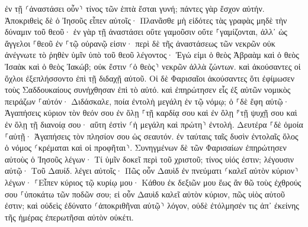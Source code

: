 \documentclass[twoside, 9pt]{extreport}
\begin{document}
ἐν τῇ ⸂ἀναστάσει οὖν⸃ τίνος τῶν ἑπτὰ ἔσται γυνή; πάντες γὰρ ἔσχον αὐτήν. 
Ἀποκριθεὶς δὲ ὁ Ἰησοῦς εἶπεν αὐτοῖς· Πλανᾶσθε μὴ εἰδότες τὰς γραφὰς μηδὲ τὴν δύναμιν τοῦ θεοῦ· 
ἐν γὰρ τῇ ἀναστάσει οὔτε γαμοῦσιν οὔτε ⸀γαμίζονται, ἀλλ᾽ ὡς ἄγγελοι ⸀θεοῦ ἐν ⸀τῷ οὐρανῷ εἰσιν· 
περὶ δὲ τῆς ἀναστάσεως τῶν νεκρῶν οὐκ ἀνέγνωτε τὸ ῥηθὲν ὑμῖν ὑπὸ τοῦ θεοῦ λέγοντος· 
Ἐγώ εἰμι ὁ θεὸς Ἀβραὰμ καὶ ὁ θεὸς Ἰσαὰκ καὶ ὁ θεὸς Ἰακώβ; οὐκ ἔστιν ⸂ὁ θεὸς⸃ νεκρῶν ἀλλὰ ζώντων. 
καὶ ἀκούσαντες οἱ ὄχλοι ἐξεπλήσσοντο ἐπὶ τῇ διδαχῇ αὐτοῦ. 
Οἱ δὲ Φαρισαῖοι ἀκούσαντες ὅτι ἐφίμωσεν τοὺς Σαδδουκαίους συνήχθησαν ἐπὶ τὸ αὐτό. 
καὶ ἐπηρώτησεν εἷς ἐξ αὐτῶν νομικὸς πειράζων ⸀αὐτόν· 
Διδάσκαλε, ποία ἐντολὴ μεγάλη ἐν τῷ νόμῳ; 
ὁ ⸀δὲ ἔφη αὐτῷ· Ἀγαπήσεις κύριον τὸν θεόν σου ἐν ὅλῃ ⸀τῇ καρδίᾳ σου καὶ ἐν ὅλῃ ⸁τῇ ψυχῇ σου καὶ ἐν ὅλῃ τῇ διανοίᾳ σου· 
αὕτη ἐστὶν ⸂ἡ μεγάλη καὶ πρώτη⸃ ἐντολή. 
Δευτέρα ⸀δὲ ὁμοία ⸀αὐτῇ· Ἀγαπήσεις τὸν πλησίον σου ὡς σεαυτόν. 
ἐν ταύταις ταῖς δυσὶν ἐντολαῖς ὅλος ὁ νόμος ⸂κρέμαται καὶ οἱ προφῆται⸃. 
Συνηγμένων δὲ τῶν Φαρισαίων ἐπηρώτησεν αὐτοὺς ὁ Ἰησοῦς 
λέγων· Τί ὑμῖν δοκεῖ περὶ τοῦ χριστοῦ; τίνος υἱός ἐστιν; λέγουσιν αὐτῷ· Τοῦ Δαυίδ. 
λέγει αὐτοῖς· Πῶς οὖν Δαυὶδ ἐν πνεύματι ⸂καλεῖ αὐτὸν κύριον⸃ λέγων· 
⸀Εἶπεν κύριος τῷ κυρίῳ μου· Κάθου ἐκ δεξιῶν μου ἕως ἂν θῶ τοὺς ἐχθρούς σου ⸀ὑποκάτω τῶν ποδῶν σου; 
εἰ οὖν Δαυὶδ καλεῖ αὐτὸν κύριον, πῶς υἱὸς αὐτοῦ ἐστιν; 
καὶ οὐδεὶς ἐδύνατο ⸂ἀποκριθῆναι αὐτῷ⸃ λόγον, οὐδὲ ἐτόλμησέν τις ἀπ᾽ ἐκείνης τῆς ἡμέρας ἐπερωτῆσαι αὐτὸν οὐκέτι. 
\end{document}
